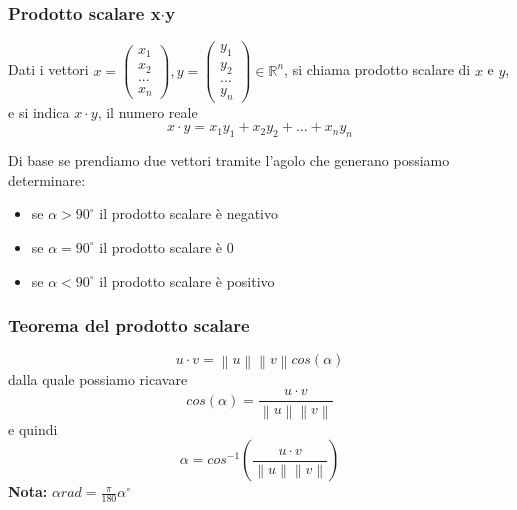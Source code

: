 \documentclass[../main.tex]{subfiles}
\begin{document}
\vspace{1.5cm}
\subsubsection{Prodotto scalare x$\cdot$y}
Dati i vettori $x = \begin{pmatrix}x_1 \\ x_2 \\ ... \\ x_n \end{pmatrix}, y = \begin{pmatrix}y_1 \\ y_2 \\ ... \\ y_n \end{pmatrix} \in \mathbb{R}^n$,
si chiama prodotto scalare di $x$ e $y$, e si indica $x \cdot y$, il numero reale
$$
    x \cdot y = x_1y_1 + x_2y_2 + ... + x_ny_n
$$

Di base se prendiamo due vettori tramite l'agolo che generano possiamo determinare:
\begin{itemize}
    \item se $\alpha > 90^{\circ}$ il prodotto scalare è negativo
    \item se $\alpha = 90^{\circ}$ il prodotto scalare è $0$
    \item se $\alpha < 90^{\circ}$ il prodotto scalare è positivo
\end{itemize}

\vspace{1cm}
\subsubsection{Teorema del prodotto scalare}
$$
   u \cdot v = \left\lVert u \right\rVert \left\lVert v \right\rVert cos(\alpha)
$$
dalla quale possiamo ricavare
$$
    cos(\alpha) = \frac{u \cdot v}{\left\lVert u\right\rVert \left\lVert v\right\rVert }
$$
e quindi
$$
    \alpha = cos^{-1}\left( \frac{u \cdot v}{\left\lVert u \right\rVert \left\lVert v \right\rVert } \right)
$$
\textbf{Nota:} $\alpha rad = \frac{\pi}{180} \alpha^\circ $

\vspace{0.5cm}
\end{document}

